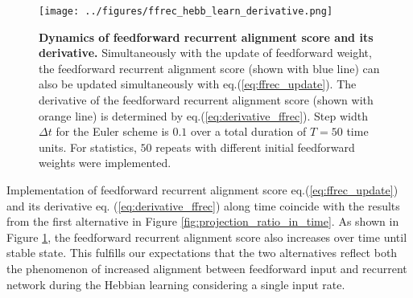 \documentclass[11pt]{article}
\begin{document}
		\begin{figure}
			\centering
			\texttt{[image: ../figures/ffrec\_hebb\_learn\_derivative.png]}
			\caption{\textbf{Dynamics of feedforward recurrent alignment score and its derivative.} Simultaneously with the update of feedforward weight, the feedforward recurrent alignment score (shown with blue line) can also be updated simultaneously with eq.(\ref{eq:ffrec_update}). The derivative of the feedforward recurrent alignment score (shown with orange line) is determined by eq.(\ref{eq:derivative_ffrec}). Step width $\Delta t$ for the Euler scheme is $0.1$ over a total duration of $T=50$ time units. For statistics, $50$ repeats with different initial feedforward weights were implemented.}
			\label{fig:ffrec_Hebb_learn}
		\end{figure}
	
	Implementation of feedforward recurrent alignment score eq.(\ref{eq:ffrec_update}) and its derivative eq. (\ref{eq:derivative_ffrec}) along time coincide with the results from the first alternative in Figure \ref{fig:projection_ratio_in_time}. As shown in Figure \ref{fig:ffrec_Hebb_learn}, the feedforward recurrent alignment score also increases over time until stable state. This fulfills our expectations that the two alternatives reflect both the phenomenon of increased alignment between feedforward input and recurrent network during the Hebbian learning considering a single input rate. 

	
\end{document}
